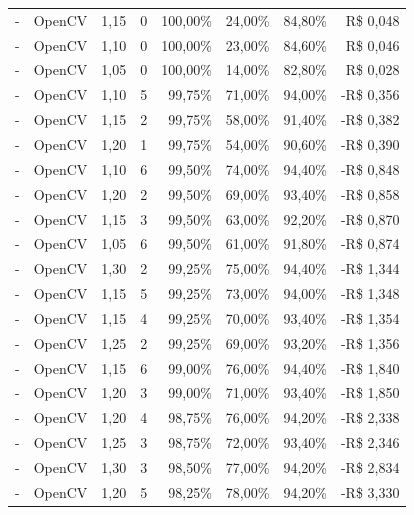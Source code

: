 \begin{table}[htbp]
\begin{tabular}{clrrrrrr}
        -     & OpenCV & 1,15 & 0  & 100,00\%      & 24,00\%        & 84,80\%  & R\$ 0,048  \\
        -     & OpenCV & 1,10 & 0  & 100,00\%      & 23,00\%        & 84,60\%  & R\$ 0,046  \\
        -     & OpenCV & 1,05 & 0  & 100,00\%      & 14,00\%        & 82,80\%  & R\$ 0,028  \\
        -     & OpenCV & 1,10 & 5  & 99,75\%       & 71,00\%        & 94,00\%  & -R\$ 0,356 \\
        -     & OpenCV & 1,15 & 2  & 99,75\%       & 58,00\%        & 91,40\%  & -R\$ 0,382 \\
        -     & OpenCV & 1,20 & 1  & 99,75\%       & 54,00\%        & 90,60\%  & -R\$ 0,390 \\
        -     & OpenCV & 1,10 & 6  & 99,50\%       & 74,00\%        & 94,40\%  & -R\$ 0,848 \\
        -     & OpenCV & 1,20 & 2  & 99,50\%       & 69,00\%        & 93,40\%  & -R\$ 0,858 \\
        -     & OpenCV & 1,15 & 3  & 99,50\%       & 63,00\%        & 92,20\%  & -R\$ 0,870 \\
        -     & OpenCV & 1,05 & 6  & 99,50\%       & 61,00\%        & 91,80\%  & -R\$ 0,874 \\
        -     & OpenCV & 1,30 & 2  & 99,25\%       & 75,00\%        & 94,40\%  & -R\$ 1,344 \\
        -     & OpenCV & 1,15 & 5  & 99,25\%       & 73,00\%        & 94,00\%  & -R\$ 1,348 \\
        -     & OpenCV & 1,15 & 4  & 99,25\%       & 70,00\%        & 93,40\%  & -R\$ 1,354 \\
        -     & OpenCV & 1,25 & 2  & 99,25\%       & 69,00\%        & 93,20\%  & -R\$ 1,356 \\
        -     & OpenCV & 1,15 & 6  & 99,00\%       & 76,00\%        & 94,40\%  & -R\$ 1,840 \\
        -     & OpenCV & 1,20 & 3  & 99,00\%       & 71,00\%        & 93,40\%  & -R\$ 1,850 \\
        -     & OpenCV & 1,20 & 4  & 98,75\%       & 76,00\%        & 94,20\%  & -R\$ 2,338 \\
        -     & OpenCV & 1,25 & 3  & 98,75\%       & 72,00\%        & 93,40\%  & -R\$ 2,346 \\
        -     & OpenCV & 1,30 & 3  & 98,50\%       & 77,00\%        & 94,20\%  & -R\$ 2,834 \\
        -     & OpenCV & 1,20 & 5  & 98,25\%       & 78,00\%        & 94,20\%  & -R\$ 3,330 \\

\end{tabular}
\end{table}
